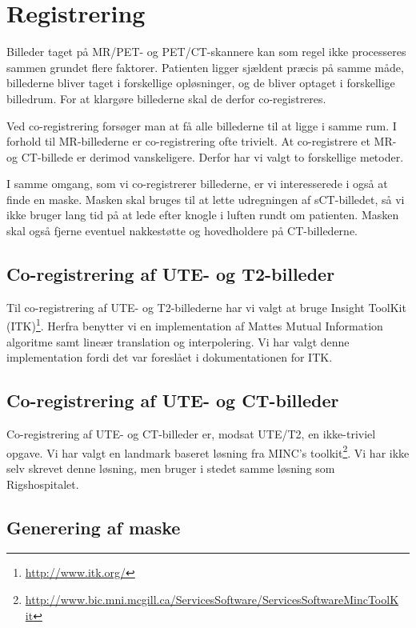 \section{Registrering}

Billeder taget på MR/PET- og PET/CT-skannere kan som regel ikke
processeres sammen grundet flere faktorer. Patienten ligger sjældent
præcis på samme måde, billederne bliver taget i forskellige
opløsninger, og de bliver optaget i forskellige billedrum. For at
klargøre billederne skal de derfor co-registreres.

Ved co-registrering forsøger man at få alle billederne til at ligge i
samme rum. I forhold til MR-billederne er co-registrering ofte trivielt.
At co-registrere et MR- og CT-billede er derimod vanskeligere. Derfor har
vi valgt to forskellige metoder.

I samme omgang, som vi co-registrerer billederne, er vi interesserede i
også at finde en maske. Masken skal bruges til at lette udregningen
af sCT-billedet, så vi ikke bruger lang tid på at lede efter knogle i
luften rundt om patienten. Masken skal også fjerne eventuel nakkestøtte og
hovedholdere på CT-billederne.

\subsection{Co-registrering af UTE- og T2-billeder}

Til co-registrering af UTE- og T2-billederne har vi valgt at bruge
Insight ToolKit (ITK)\footnote{\url{http://www.itk.org/}}. Herfra benytter vi en implementation af Mattes
Mutual Information algoritme samt lineær translation og interpolering. Vi har valgt denne implementation fordi det var foreslået i dokumentationen for ITK.

\subsection{Co-registrering af UTE- og CT-billeder}

Co-registrering af UTE- og CT-billeder er, modsat UTE/T2, en ikke-triviel
opgave. Vi har valgt en landmark baseret løsning fra MINC's toolkit\footnote{\url{http://www.bic.mni.mcgill.ca/ServicesSoftware/ServicesSoftwareMincToolK it}}.
Vi har ikke selv skrevet denne løsning, men bruger i stedet samme
løsning som Rigshospitalet.

\subsection{Generering af maske}

